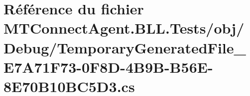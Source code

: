 \hypertarget{_m_t_connect_agent_8_b_l_l_8_tests_2obj_2_debug_2_temporary_generated_file___e7_a71_f73-0_f8_d-47f68bf9a00488221117e11b484b413e9}{}\section{Référence du fichier M\+T\+Connect\+Agent.\+B\+L\+L.\+Tests/obj/\+Debug/\+Temporary\+Generated\+File\+\_\+\+E7\+A71\+F73-\/0\+F8\+D-\/4\+B9\+B-\/\+B56\+E-\/8\+E70\+B10\+B\+C5\+D3.cs}
\label{_m_t_connect_agent_8_b_l_l_8_tests_2obj_2_debug_2_temporary_generated_file___e7_a71_f73-0_f8_d-47f68bf9a00488221117e11b484b413e9}
